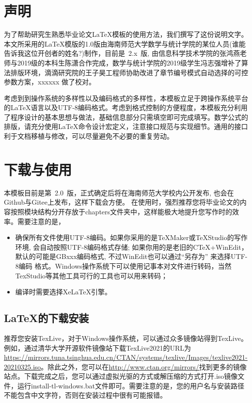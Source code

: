 \introduction

\section*{声明}
为了帮助研究生熟悉毕业论文{\LaTeX{}}模板的使用方法，我们撰写了这份说明文字。本文所采用的{\LaTeX{}}模版的1.0版由海南师范大学数学与统计学院的某位人员(谁能告诉我这位开创者的姓名?)制作，目前是~2.x~版, 由信息科学技术学院的张鸿燕老师与2019级的本科生陈潇合作完成，数学与统计学院的2019级学生冯志强增补了算法排版环境，滴滴研究院的王子昊工程师协助改进了章节编号模式自动选择的可控参数方案，xxxxxx 做了校对。

考虑到到操作系统的多样性以及编码格式的多样性，本模板立足于跨操作系统平台的{\LaTeX{}}语言以及UTF-8编码格式。考虑到格式控制的方便程度，本模板充分利用了程序设计的基本思想与做法，基础信息部分只需填空即可完成填写。数学公式的排版，请充分使用{\LaTeX{}}命令设计宏定义，注意接口规范与实现细节。通用的接口利于文档移植与修改，可以尽量避免不必要的重复劳动。

\section*{下载与使用}

本模板目前是第~2.0~版，正式确定后将在海南师范大学校内公开发布, 也会在Github与Gitee上发布，这样下载会方便。
在使用时，强烈推荐您将毕业论文的内容按照模块结构分开存放于chapters文件夹中，这样能极大地提升您写作时的效率。需要注意的是，
\begin{itemize}
\item 确保所有文件使用UTF-8编码。如果你采用的是TeXMaker或TeXStudio的写作环境, 会自动按照UTF-8编码格式存储;
	如果你用的是老旧的CTeX+WinEdit，默认的可能是GBxxx编码格式, 不过WinEdit也可以通过“另存为” 来选择UTF-8编码
	格式。Windows操作系统下可以使用记事本对文件进行转码，当然TexStudio等其他工具可行的工具也可以用来转码；
\item 编译时需要选择XeLaTeX引擎。
\end{itemize}

\subsection*{\LaTeX{}的下载安装}
推荐您安装TexLive，对于Windows操作系统，可以通过众多镜像站得到TexLive。例如，通过清华大学开源软件镜像站下载TexLive2021的URL为\url{https://mirrors.tuna.tsinghua.edu.cn/CTAN/systems/texlive/Images/texlive2021-20210325.iso}。除此之外，您可以在\url{http://www.ctan.org/mirrors/}找到更多的镜像站点。下载完成之后，您可以通过虚拟光驱的方式或解压缩的方式打开.iso镜像文件，运行install-tl-windows.bat文件即可。需要注意的是，您的用户名与安装路径不能包含中文字符，否则在安装过程中很有可能报错。

